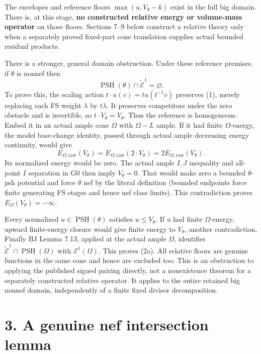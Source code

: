 \documentclass[
  10pt,
]{article}
\begin{document}
The envelopes and reference floors \(\max(u,V_\theta-k)\) exist in the
full big domain. There is, at this stage, \textbf{no constructed
relative energy or volume-mass operator} on those floors. Sections 7--9
below construct a relative theory only when a separately proved
fixed-part cone translation supplies actual bounded residual products.

There is a stronger, general domain obstruction. Under these reference
premises, if \(\theta\) is nonnef then
\[\operatorname{PSH}(\theta)\cap\widetilde{\mathcal E}^{1}=\varnothing. \tag{2a}\]
To prove this, the scaling action \(t\cdot u(v)=t u(t^{-1}v)\) preserves
(1), merely replacing each FS weight \(\lambda\) by \(t\lambda\). It
preserves competitors under the zero obstacle and is invertible, so
\(t\cdot V_\theta=V_\theta\). Thus the reference is homogeneous. Embed
it in an actual ample cone \(\Omega\) with \(\Omega-L\) ample. If it had
finite \(\Omega\)-energy, the model base-change identity, passed through
actual ample decreasing energy continuity, would give
\[E_{\Omega,\mathrm{raw}}(V_\theta)=E_{\Omega,\mathrm{raw}}(2\cdot V_\theta)
      =2E_{\Omega,\mathrm{raw}}(V_\theta).\] Its normalized energy would
be zero. The actual ample \(I,J\) inequality and all-point \(I\)
separation in G0 then imply \(V_\theta=0\). That would make zero a
bounded \(\theta\)-psh potential and force \(\theta\) nef by the literal
definition (bounded endpoints force finite generating FS stages and
hence nef class limits). This contradiction proves
\(E_\Omega(V_\theta)=-\infty\).

Every normalized \(u\in\operatorname{PSH}(\theta)\) satisfies
\(u\le V_\theta\). If \(u\) had finite \(\Omega\)-energy, upward
finite-energy closure would give finite energy to \(V_\theta\), another
contradiction. Finally BJ Lemma 7.13, applied at the actual ample
\(\Omega\), identifies
\(\widetilde{\mathcal E}^{1}\cap\operatorname{PSH}(\Omega)\) with
\(\mathcal E^1(\Omega)\). This proves (2a). All relative floors are
genuine functions in the same cone and hence are excluded too. This is
an obstruction to applying the published signed pairing directly, not a
nonexistence theorem for a separately constructed relative operator. It
applies to the entire retained big nonnef domain, independently of a
finite fixed divisor decomposition.

\section{3. A genuine nef intersection
lemma}\label{a-genuine-nef-intersection-lemma}
\end{document}
